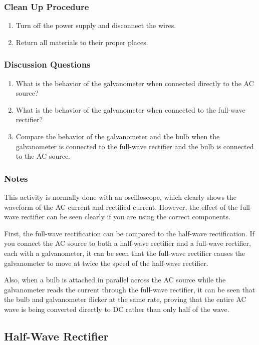 \subsubsection*{Clean Up Procedure}
\begin{enumerate}
\item{Turn off the power supply and disconnect the wires.}
\item{Return all materials to their proper places.}
\end{enumerate}

\subsubsection*{Discussion Questions}
\begin{enumerate}
\item{What is the behavior of the galvanometer when connected directly to the AC source?}
\item{What is the behavior of the galvanometer when connected to the full-wave rectifier?}
\item{Compare the behavior of the galvanometer and the bulb when the galvanometer is connected to the full-wave rectifier and the bulb is connected to the AC source.}
\end{enumerate}

\subsubsection*{Notes}
This activity is normally done with an oscilloscope, which clearly shows the waveform of the AC current and rectified current.  However, the effect of the full-wave rectifier can be seen clearly if you are using the correct components.

First, the full-wave rectification can be compared to the half-wave rectification.  If you connect the AC source to both a half-wave rectifier and a full-wave rectifier, each with a galvanometer, it can be seen that the full-wave rectifier causes the galvanometer to move at twice the speed of the half-wave rectifier.

Also, when a bulb is attached in parallel across the AC source while the galvanometer reads the current through the full-wave rectifier, it can be seen that the bulb and galvanometer flicker at the same rate, proving that the entire AC wave is being converted directly to DC rather than only half of the wave.

\subsection{Half-Wave Rectifier}

